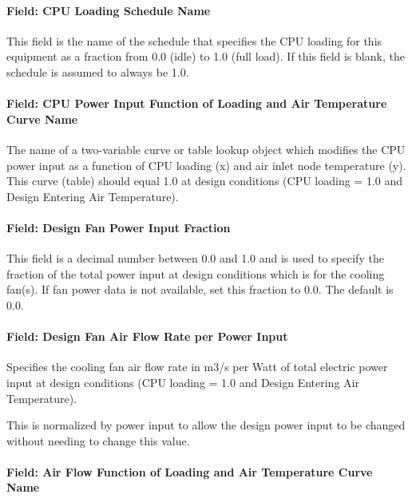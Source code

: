 \paragraph{Field: CPU Loading Schedule Name}\label{field-cpu-loading-schedule-name}

This field is the name of the schedule that specifies the CPU loading for this equipment as a fraction from 0.0 (idle) to 1.0 (full load). If this field is blank, the schedule is assumed to always be 1.0.

\paragraph{Field: CPU Power Input Function of Loading and Air Temperature Curve Name}\label{field-cpu-power-input-function-of-loading-and-air-temperature-curve-name}

The name of a two-variable curve or table lookup object which modifies the CPU power input as a function of CPU loading (x) and air inlet node temperature (y). This curve (table) should equal 1.0 at design conditions (CPU loading = 1.0 and Design Entering Air Temperature).

\paragraph{Field: Design Fan Power Input Fraction}\label{field-design-fan-power-input-fraction}

This field is a decimal number between 0.0 and 1.0 and is used to specify the fraction of the total power input at design conditions which is for the cooling fan(s). If fan power data is not available, set this fraction to 0.0. The default is 0.0.

\paragraph{Field: Design Fan Air Flow Rate per Power Input}\label{field-design-fan-air-flow-rate-per-power-input}

Specifies the cooling fan air flow rate in m3/s per Watt of total electric power input at design conditions (CPU loading = 1.0 and Design Entering Air Temperature).

This is normalized by power input to allow the design power input to be changed without needing to change this value.

\paragraph{Field: Air Flow Function of Loading and Air Temperature Curve Name}\label{field-air-flow-function-of-loading-and-air-temperature-curve-name}

